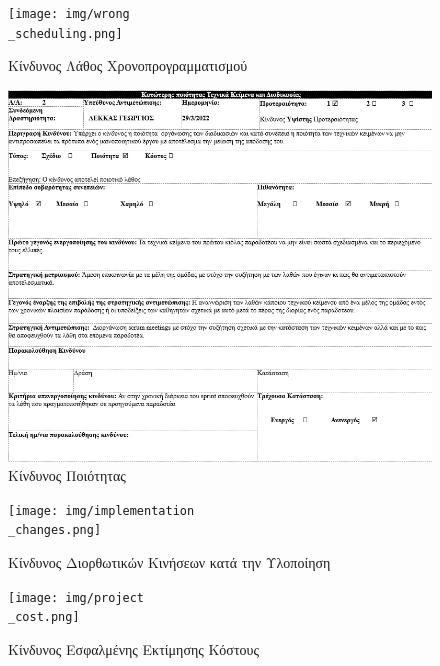 \documentclass{../ol-softwaremanual}
\begin{document}
	
	\newpage 
	
	
	\flushleft
	
	\begin{figure}[htbp!]
		\texttt{[image: img/wrong\\\_scheduling.png]}
		\caption{Κίνδυνος Λάθος Χρονοπρογραμματισμού}
	\end{figure}
	
	\newpage
	
	
	
	\begin{figure}[htbp!]
		\includegraphics[scale=0.76]{img/bad_quality.png}
		\caption{Κίνδυνος Ποιότητας}
	\end{figure}
	
	\newpage
	
	\begin{figure}[htbp!]
		\texttt{[image: img/implementation\\\_changes.png]}
		\caption{Κίνδυνος Διορθωτικών Κινήσεων κατά την Υλοποίηση}
	\end{figure}
	
	
	
	\newpage
	
	\begin{figure}[htbp!]
		\texttt{[image: img/project\\\_cost.png]}
		\caption{Κίνδυνος Εσφαλμένης Εκτίμησης Κόστους}
	\end{figure}
	
\end{document}
